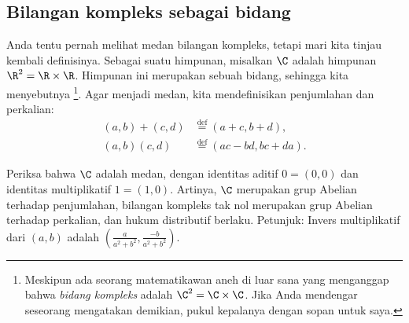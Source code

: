 
\subsection{Bilangan kompleks sebagai bidang} 

Anda tentu pernah melihat medan bilangan kompleks,
tetapi mari kita tinjau kembali definisinya.
Sebagai suatu himpunan, misalkan \emph{}
$\C$ adalah himpunan $\R^2 = \R \times \R$.
Himpunan ini merupakan sebuah bidang, sehingga kita menyebutnya
\emph{}%
\footnote{Meskipun ada seorang matematikawan aneh di luar sana yang
menganggap bahwa \emph{bidang kompleks} adalah $\C^2 = \C \times \C$.
Jika Anda mendengar seseorang mengatakan demikian, pukul kepalanya dengan
sopan untuk saya.}.
Agar menjadi medan, kita mendefinisikan penjumlahan dan perkalian:
\begin{align*}
(a,b) + (c,d) & \overset{\text{def}}{=} (a+c,b+d) , \\
(a,b) (c,d) & \overset{\text{def}}{=} (ac-bd,bc+da) .
\end{align*}

\begin{exbox}
\begin{exercise}%
Periksa bahwa $\C$ adalah medan, dengan identitas aditif
$0=(0,0)$ dan identitas multiplikatif $1=(1,0)$.
Artinya, $\C$ merupakan grup Abelian terhadap penjumlahan,
bilangan kompleks tak nol merupakan grup Abelian terhadap perkalian,
dan hukum distributif berlaku. Petunjuk: Invers multiplikatif dari $(a,b)$
adalah $\left(\frac{a}{a^2+b^2},\frac{-b}{a^2+b^2}\right)$.
\end{exercise}
\end{exbox}
